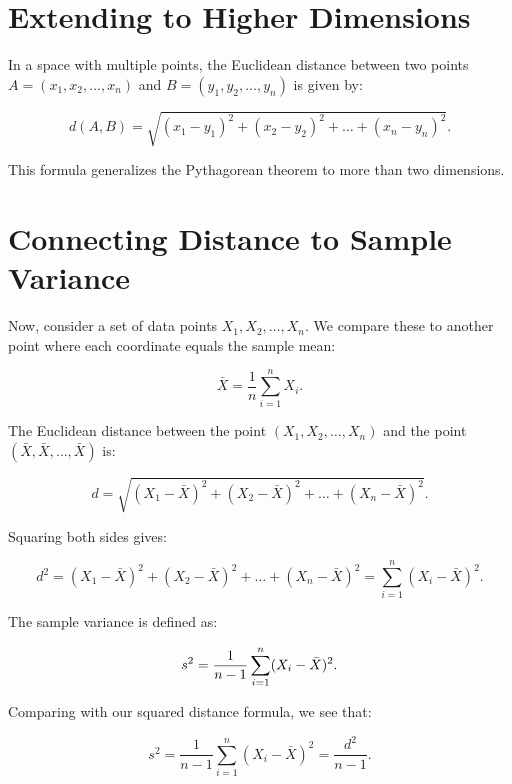 \documentclass{article}
\begin{document}
\section{Extending to Higher Dimensions}

In a space with multiple points, the Euclidean distance between two points \(A = (x_1, x_2, \dots, x_n)\) and \(B = (y_1, y_2, \dots, y_n)\) is given by:

\begin{equation}
    d(A, B) = \sqrt{(x_1 - y_1)^2 + (x_2 - y_2)^2 + \dots + (x_n - y_n)^2}.
\end{equation}

This formula generalizes the Pythagorean theorem to more than two dimensions.

\section{Connecting Distance to Sample Variance}

Now, consider a set of data points \(X_1, X_2, \dots, X_n\). We compare these to another point where each coordinate equals the sample mean:

\begin{equation}
    \bar{X} = \frac{1}{n} \sum_{i=1}^{n} X_i.
\end{equation}

The Euclidean distance between the point \((X_1, X_2, \dots, X_n)\) and the point \((\bar{X}, \bar{X}, \dots, \bar{X})\) is:

\begin{equation}
    d = \sqrt{(X_1 - \bar{X})^2 + (X_2 - \bar{X})^2 + \dots + (X_n - \bar{X})^2}.
\end{equation}

Squaring both sides gives:

\begin{equation}
    d^2 = (X_1 - \bar{X})^2 + (X_2 - \bar{X})^2 + \dots + (X_n - \bar{X})^2 = \sum_{i=1}^{n} (X_i - \bar{X})^2.
\end{equation}

The sample variance is defined as:

\begin{equation}
    s^2 = \frac{1}{n-1} \sum_{i=1}^{n} (X_i - \bar{X})^2. \\
\end{equation}

Comparing with our squared distance formula, we see that:

\begin{equation}
    s^2 = \frac{1}{n-1} \sum_{i=1}^{n} (X_i - \bar{X})^2 =  \frac{d^2}{n-1}.
\end{equation}
\end{document}
